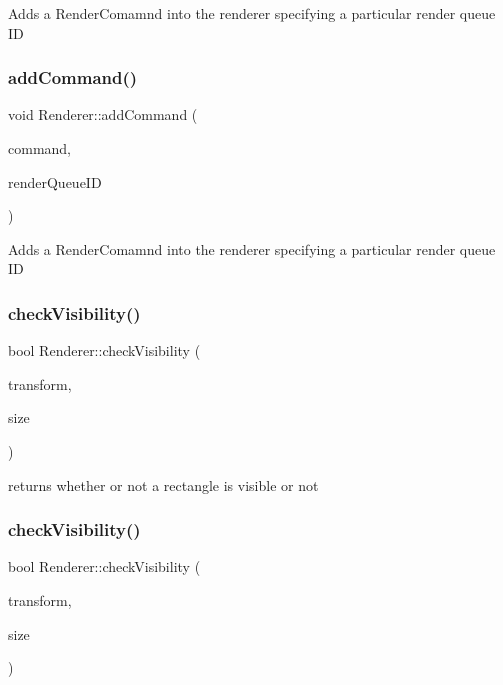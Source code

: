 Adds a {\ttfamily Render\+Comamnd} into the renderer specifying a particular render queue ID \mbox{\label{classRenderer_a1f3d985bb6e68a761af9b5eeab87282f}} 
\subsubsection{\texorpdfstring{add\+Command()}{addCommand()}\hspace{0.1cm}{\footnotesize\ttfamily [4/4]}}
{\footnotesize\ttfamily void Renderer\+::add\+Command (\begin{DoxyParamCaption}\item[{\hyperlink{classRenderCommand}{Render\+Command} $\ast$}]{command,  }\item[{int}]{render\+Queue\+ID }\end{DoxyParamCaption})}

Adds a {\ttfamily Render\+Comamnd} into the renderer specifying a particular render queue ID \mbox{\label{classRenderer_a00f5f0b6bc05c02965d98dbfd5e4e0bb}} 
\subsubsection{\texorpdfstring{check\+Visibility()}{checkVisibility()}\hspace{0.1cm}{\footnotesize\ttfamily [1/2]}}
{\footnotesize\ttfamily bool Renderer\+::check\+Visibility (\begin{DoxyParamCaption}\item[{const \hyperlink{classMat4}{Mat4} \&}]{transform,  }\item[{const \hyperlink{classSize}{Size} \&}]{size }\end{DoxyParamCaption})}

returns whether or not a rectangle is visible or not \mbox{\label{classRenderer_a00f5f0b6bc05c02965d98dbfd5e4e0bb}} 
\subsubsection{\texorpdfstring{check\+Visibility()}{checkVisibility()}\hspace{0.1cm}{\footnotesize\ttfamily [2/2]}}
{\footnotesize\ttfamily bool Renderer\+::check\+Visibility (\begin{DoxyParamCaption}\item[{const \hyperlink{classMat4}{Mat4} \&}]{transform,  }\item[{const \hyperlink{classSize}{Size} \&}]{size }\end{DoxyParamCaption})}

